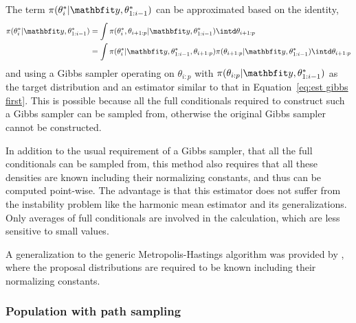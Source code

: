 The term $\pi(\theta_i^*|\data,\theta_{1:i-1}^*)$ can be approximated based on the identity,
\begin{align}
  \pi(\theta_i^*|\data,\theta_{1:i-1}^*)
  &= \int \pi(\theta_i^*,\theta_{i+1:p}|\data,\theta_{1:i-1}^*)
  \intd\theta_{i+1:p} \notag\\
  &= \int \pi(\theta_i^*|\data,\theta_{1:i-1}^*,\theta_{i+1:p})
  \pi(\theta_{i+1:p}|\data,\theta_{1:i-1}^*) \intd\theta_{i+1:p}
\end{align}
and using a Gibbs sampler operating on $\theta_{i:p}$ with $\pi(\theta_{i:p}|\data,\theta_{1:i-1}^*)$ as the target distribution and an estimator similar to that in Equation~\eqref{eq:est gibbs first}. This is possible because all the full conditionals required to construct such a Gibbs sampler can be sampled from, otherwise the original Gibbs sampler cannot be constructed.

In addition to the usual requirement of a Gibbs sampler, that all the full conditionals can be sampled from, this method also requires that all these densities are known including their normalizing constants, and thus can be computed point-wise. The advantage is that this estimator does not suffer from the instability problem like the harmonic mean estimator and its generalizations. Only averages of full conditionals are involved in the calculation, which are less sensitive to  small values.

A generalization to the generic Metropolis-Hastings algorithm was provided by \cite{Chib:2001gq}, where the proposal distributions are required to be known including their normalizing constants.

\subsubsection{Population \mcmc with path sampling}
\label{ssub:Population mcmc with path sampling}


